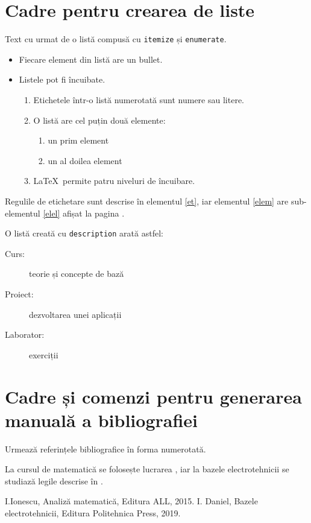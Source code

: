 \documentclass{article}
\begin{document}
\section{Cadre pentru crearea de liste}
Text  cu  urmat de o listă compusă cu \verb+itemize+ și \verb+enumerate+.
\begin{itemize}
\item Fiecare element din listă are un bullet.
\item Listele pot fi încuibate.
\begin{enumerate}
\item Etichetele într-o listă numerotată sunt numere sau litere.\label{et}
\item O listă are cel puțin două elemente:\label{elem}
\begin{enumerate}
\item un prim element
\item un al doilea element\label{elel}
\end{enumerate}
\item \LaTeX\ permite patru niveluri de încuibare.
\end{enumerate}
\end{itemize}
\par
Regulile de etichetare sunt descrise în elementul \ref{et}, iar elementul \ref{elem} are sub-elementul \ref{elel} afișat la pagina \pageref{elel}.\par 
O listă creată cu \verb+description+ arată astfel:
\begin{description}
\item[Curs:] teorie și concepte de bază
\item[Proiect:] dezvoltarea unei aplicații
\item[Laborator:] exerciții
\end{description}
\section{Cadre și comenzi pentru generarea manuală a bibliografiei}
Urmează referințele bibliografice în forma numerotată.\par
La cursul de matematică se folosește lucrarea \cite{mat}, iar la bazele electrotehnicii se studiază legile descrise în \cite{elth}.
\begin{thebibliography}{a}
 I.Ionescu, Analiză matematică, Editura ALL, 2015.
 I. Daniel, Bazele electrotehnicii, Editura Politehnica Press, 2019.
\end{thebibliography}
\end{document}
